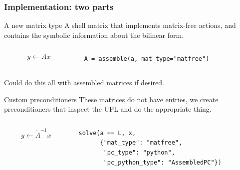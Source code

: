 \documentclass[presentation,aspectratio=43]{beamer}
\begin{document}
\begin{frame}[fragile,t]
  \frametitle{Implementation: two parts}
  \begin{block}{A new matrix type}
    \vspace{0.2ex}
    A shell matrix that implements matrix-free actions, and contains
    the symbolic information about the bilinear form.
    \begin{columns}
      \begin{column}{0.5\textwidth}
      \begin{equation*}
        y \leftarrow A x
      \end{equation*}
    \end{column}
    \hspace{-0.1\textwidth}
    \begin{column}{0.7\textwidth}
\begin{verbatim}
A = assemble(a, mat_type="matfree")
\end{verbatim}
    \end{column}
    \end{columns}
    \begin{flushright}
      \footnotesize Could do this all with assembled matrices if desired.
    \end{flushright}
  \end{block}
  \begin{block}{Custom preconditioners}
    \vspace{0.2ex}
    These matrices do not have entries, we create preconditioners
    that inspect the UFL and do the appropriate thing.
    \begin{columns}
      \begin{column}{0.5\textwidth}
    \begin{equation*}
      y \leftarrow \tilde{A}^{-1} x
    \end{equation*}
  \end{column}
  \hspace{-0.1\textwidth}
  \begin{column}{0.7\textwidth}
\begin{verbatim}
solve(a == L, x,
      {"mat_type": "matfree",
       "pc_type": "python",
       "pc_python_type": "AssembledPC"})
\end{verbatim}
  \end{column}
  \end{columns}
  \end{block}
\end{frame}
\end{document}
